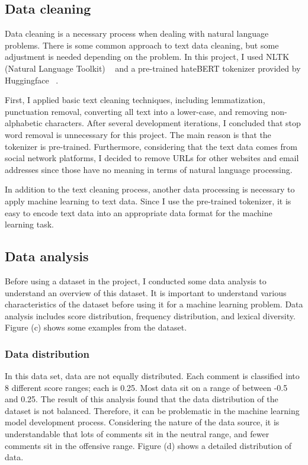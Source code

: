 \documentclass[11pt, natbib=false]{article}
\begin{document}
\subsection{Data cleaning}
Data cleaning is a necessary process when dealing with natural language problems.
There is some common approach to text data cleaning, but some adjustment is needed depending on the problem.
In this project, I used NLTK (Natural Language Toolkit) ~\cite{nltk} and a pre-trained hateBERT tokenizer provided by Huggingface ~\cite{huggingface}.

First, I applied basic text cleaning techniques, including lemmatization, punctuation removal, converting all text into a lower-case, and removing non-alphabetic characters.
After several development iterations, I concluded that stop word removal is unnecessary for this project.
The main reason is that the tokenizer is pre-trained.
Furthermore, considering that the text data comes from social network platforms, I decided to remove URLs for other websites and email addresses since those have no meaning in terms of natural language processing.

In addition to the text cleaning process, another data processing is necessary to apply machine learning to text data.
Since I use the pre-trained tokenizer, it is easy to encode text data into an appropriate data format for the machine learning task.


\subsection{Data analysis}
Before using a dataset in the project, I conducted some data analysis to understand an overview of this dataset.
It is important to understand various characteristics of the dataset before using it for a machine learning problem.
Data analysis includes score distribution, frequency distribution, and lexical diversity.
Figure (c) shows some examples from the dataset.

\subsubsection{Data distribution}
In this data set, data are not equally distributed.
Each comment is classified into 8 different score ranges; each is 0.25.
Most data sit on a range of between -0.5 and 0.25.
The result of this analysis found that the data distribution of the dataset is not balanced.
Therefore, it can be problematic in the machine learning model development process.
Considering the nature of the data source, it is understandable that lots of comments sit in the neutral range, and fewer comments sit in the offensive range.
Figure (d) shows a detailed distribution of data.
\end{document}
